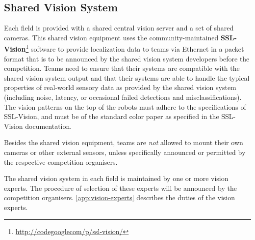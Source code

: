 \subsection{Shared Vision System}
Each field is provided with a shared central vision server and a set of shared
cameras. This shared vision equipment uses the community-maintained
\textbf{SSL-Vision}\footnote{\url{http://codegooglecom/p/ssl-vision/}} software
to provide localization data to teams via Ethernet in a packet format that is to
be announced by the shared vision system developers before the competition.
Teams need to ensure that their systems are compatible with the shared vision
system output and that their systems are able to handle the typical properties
of real-world sensory data as provided by the shared vision system (including
noise, latency, or occasional failed detections and misclassifications).
The vision patterns on the top of the robots must adhere to the
specifications of SSL-Vision, and must be of the standard color paper as
specified in the SSL-Vision documentation.

Besides the shared vision equipment, teams are \emph{not} allowed to mount
their own cameras or other external sensors, unless specifically announced or
permitted by the respective competition organisers.

The shared vision system in each field is maintained by one or more vision
experts. The procedure of selection of these experts will be announced by the
competition organisers. \autoref{app:vision-experts} describes the duties of the
vision experts.

